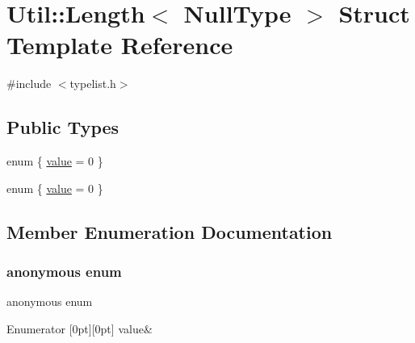 \hypertarget{structUtil_1_1TL_1_1Length_3_01NullType_01_4}{}\section{Util\+:\+:Length$<$ Null\+Type $>$ Struct Template Reference}
\label{structUtil_1_1TL_1_1Length_3_01NullType_01_4}


{\ttfamily \#include $<$typelist.\+h$>$}

\subsection*{Public Types}
\begin{DoxyCompactItemize}
\item 
enum \{ \mbox{\hyperlink{structUtil_1_1TL_1_1Length_3_01NullType_01_4_a042bb471496a540cbcc9a9441edd3b6ea61d625fe199814f6443a5c37c7b429a4}{value}} = 0
 \}
\item 
enum \{ \mbox{\hyperlink{structUtil_1_1TL_1_1Length_3_01NullType_01_4_a042bb471496a540cbcc9a9441edd3b6ea61d625fe199814f6443a5c37c7b429a4}{value}} = 0
 \}
\end{DoxyCompactItemize}


\subsection{Member Enumeration Documentation}
\mbox{\label{structUtil_1_1TL_1_1Length_3_01NullType_01_4_abfac2723723663dccd5a61f3fe8c3a28}} 
\subsubsection{\texorpdfstring{anonymous enum}{anonymous enum}}
{\footnotesize\ttfamily anonymous enum}

\begin{DoxyEnumFields}{Enumerator}
[0pt][0pt]{}\mbox{\label{structUtil_1_1TL_1_1Length_3_01NullType_01_4_a042bb471496a540cbcc9a9441edd3b6ea61d625fe199814f6443a5c37c7b429a4}} 
value&\\
\hline

\end{DoxyEnumFields}
\mbox{\label{structUtil_1_1TL_1_1Length_3_01NullType_01_4_a042bb471496a540cbcc9a9441edd3b6e}} 

